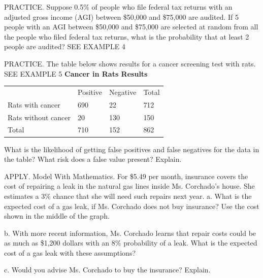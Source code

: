 \documentclass{article}
\newenvironment{practice}[2]{}{}        %
\newcommand{\answer}[1]{}               %
\newcommand{\placeholder}[2]{}          %
\begin{document}
\begin{practice}{19}{3}
PRACTICE. Suppose 0.5\% of people who file federal tax returns with an adjusted gross income (AGI) between \$50,000 and \$75,000 are audited. If 5 people with an AGI between \$50,000 and \$75,000 are selected at random from all the people who filed federal tax returns, what is the probability that at least 2 people are audited? SEE EXAMPLE 4
\answer{about 0.00025, or 0.025\%}
\end{practice}
\begin{practice}{20}{2}
PRACTICE. The table below shows results for a cancer screening test with rats. SEE EXAMPLE 5
\textbf{Cancer in Rats Results}
\begin{tabular}{llll}
 & Positive & Negative & Total \\
Rats with cancer & 690 & 22 & 712 \\
Rats without cancer & 20 & 130 & 150 \\
Total & 710 & 152 & 862 \\
\end{tabular}
What is the likelihood of getting false positives and false negatives for the data in the table? What risk does a false value present? Explain.
\answer{false positive is (\frac{20}{710}\approx2.8\%); false negative is (\frac{22}{152}\approx14\%); A false positive is a rat that tested positive for cancer but does not have it, while a false negative is a rat that tested negative for cancer but has it.}
\end{practice}
\begin{practice}{21}{3}
APPLY. Model With Mathematics. For \$5.49 per month, insurance covers the cost of repairing a leak in the natural gas lines inside Ms. Corchado's house. She estimates a 3\% chance that she will need such repairs next year.
a. What is the expected cost of a gas leak, if Ms. Corchado does not buy insurance? Use the cost shown in the middle of the graph.
\answer{a. \$19.71}
b. With more recent information, Ms. Corchado learns that repair costs could be as much as \$1,200 dollars with an 8\% probability of a leak. What is the expected cost of a gas leak with these assumptions?
\answer{b. \$96.00}
c. Would you advise Ms. Corchado to buy the insurance? Explain.
\answer{c. Since (12\text{ mo}\times\$5.49/\text{mo}=\$65.88), the cost of the insurance for a year is \$65.88. Since the repair costs could be as much as \$1,200 and that the probability of a leak could be 8\%, the expected cost of a gas leak without insurance could be as high as \$96.00. She should buy the insurance.}
\placeholder{graph}{Shaded bell curve, no axes or ticks. Purple point at peak and dotted horizontal guide to Average Reported Costs \$657. Left pale tail labeled Low Cost \$150; middle darker band Most Spent Between \$387 to \$951; right dark tail High Cost \$1,200.}
\end{practice}
\end{document}
